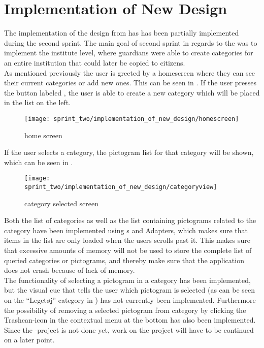\section{Implementation of New Design}
\label{sec:implementation_of_new_design}

The implementation of the design from  has has been partially implemented during the second sprint. The main goal of second sprint in regards to the \ct was to implement the institute level, where guardians were able to create categories for an entire institution that could later be copied to citizens.\\

As mentioned previously the user is greeted by a homescreen where they can see their current categories or add new ones. This can be seen in . If the user presses the button labeled , the user is able to create a new category which will be placed in the list on the left. 

\begin{figure}[!htbp]
    \centering
    \texttt{[image: sprint\_two/implementation\_of\_new\_design/homescreen]}
    \caption{\ct home screen}
    \label{fig:ct_home_screen}
\end{figure}

If the user selects a category, the pictogram list for that category will be shown, which can be seen in .\\

\begin{figure}[!htbp]
    \centering
    \texttt{[image: sprint\_two/implementation\_of\_new\_design/categoryview]}
    \caption{\ct category selected screen}
    \label{fig:ct_category_view}
\end{figure}


Both the list of categories as well as the list containing pictograms related to the category have been implemented using s and Adapters, which makes sure that items in the list are only loaded when the users scrolls past it. This makes sure that excessive amounts of memory will not be used to store the complete list of queried categories or pictograms, and thereby make sure that the application does not crash because of lack of memory. \\

The functionality of selecting a pictogram in a category has been implemented, but the visual cue that tells the user which pictogram is selected (as can be seen on the ``Leget\o j'' category in ) has not currently been implemented. Furthermore the possibility of removing a selected pictogram from category by clicking the Trashcan-icon in the contextual menu at the bottom has also been implemented. Since the \ct-project is not done yet, work on the project will have to be continued on a later point.  